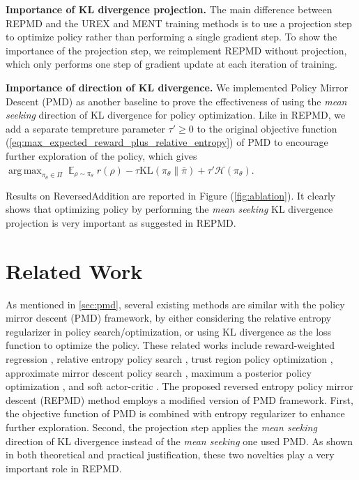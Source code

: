 \documentclass{article}
\DeclareMathOperator*\argmax{arg\,max}
\DeclareMathOperator*\ep{\mathbb{E}}
\newcommand*{\refPi}{\bar{\pi}}
\newcommand*{\cH}{\mathcal{H}}
\begin{document}
\textbf{Importance of KL divergence projection.} The main difference between REPMD and the UREX and MENT training methods is to use a projection step to optimize policy rather than performing a single gradient step. To show the importance of the projection step, we reimplement REPMD without projection, which only performs one step of gradient update at each iteration of training. 

\textbf{Importance of direction of KL divergence.} We implemented Policy Mirror Descent (PMD) as another baseline to prove the effectiveness of using the \emph{mean seeking} direction of KL divergence for policy optimization. Like in REPMD, we add a separate tempreture parameter $\tau'\geq 0$ to the original objective function (\ref{eq:max_expected_reward_plus_relative_entropy}) of PMD to encourage further exploration of the policy, which gives $\argmax_{\pi_\theta \in \Pi}{ \ep_{\rho \sim \pi_\theta}{  r(\rho)  - \tau \text{KL}(\pi_\theta \| \refPi) } + \tau'\cH(\pi_\theta) }$.

Results on ReversedAddition are reported in Figure (\ref{fig:ablation}). It clearly shows that optimizing policy by performing the \emph{mean seeking} KL divergence projection is very important as suggested in REPMD. 

\section{Related Work}
\label{related_work}
As mentioned in \cref{sec:pmd}, several existing methods are similar with the policy mirror descent (PMD) framework, by either considering the relative entropy regularizer in policy search/optimization, or using KL divergence as the loss function to optimize the policy. These related works include reward-weighted regression \cite{peters2007reinforcement,wierstra2008episodic}, relative entropy policy search \cite{peters2010relative}, trust region policy optimization \cite{schulman2015trust}, approximate mirror descent policy search \cite{montgomery2016guided}, maximum a posterior policy optimization \cite{abdolmaleki2018maximum}, and soft actor-critic \cite{haarnoja2018soft}. The proposed reversed entropy policy mirror descent (REPMD) method employs a modified version of PMD framework. First, the objective function of PMD is combined with entropy regularizer to enhance further exploration. Second, the projection step applies the \emph{mean seeking} direction of KL divergence instead of the \emph{mean seeking} one used PMD. As shown in both theoretical and practical justification, these two novelties play a very important role in REPMD. 
\end{document}
